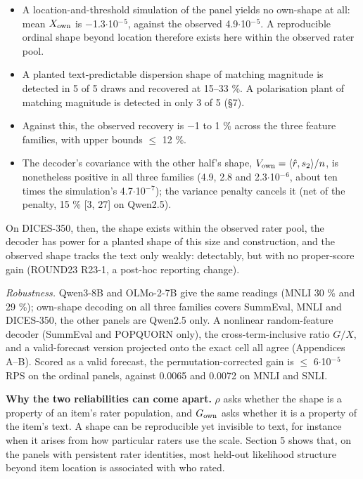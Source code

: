 \documentclass{article}
\providecommand{\tightlist}{\setlength{\itemsep}{0pt}\setlength{\parskip}{0pt}}
\begin{document}
\begin{itemize}
\tightlist
\item
  A location-and-threshold simulation of the panel yields no own-shape at all: mean \(X_{\rm own}\) is $-$1.3$\cdot$10$^{-}$$^{5}$, against the observed 4.9$\cdot$10$^{-}$$^{5}$. A reproducible ordinal shape beyond location therefore exists here within the observed rater pool.
\item
  A planted text-predictable dispersion shape of matching magnitude is detected in 5 of 5 draws and recovered at 15--33 \%. A polarisation plant of matching magnitude is detected in only 3 of 5 (\S{}7).
\item
  Against this, the observed recovery is $-$1 to 1 \% across the three feature families, with upper bounds $\leq$ 12 \%.
\item
  The decoder's covariance with the other half's shape, \(V_{\rm own}=\langle\hat r,s_2\rangle/n\), is nonetheless positive in all three families (4.9, 2.8 and 2.3$\cdot$10$^{-}$$^{6}$, about ten times the simulation's 4.7$\cdot$10$^{-}$$^{7}$); the variance penalty cancels it (net of the penalty, 15 \% {[}3, 27{]} on Qwen2.5).
\end{itemize}

On DICES-350, then, the shape exists within the observed rater pool, the decoder has power for a planted shape of this size and construction, and the observed shape tracks the text only weakly: detectably, but with no proper-score gain (ROUND23 R23-1, a post-hoc reporting change).

\emph{Robustness.} Qwen3-8B and OLMo-2-7B give the same readings (MNLI 30 \% and 29 \%); own-shape decoding on all three families covers SummEval, MNLI and DICES-350, the other panels are Qwen2.5 only. A nonlinear random-feature decoder (SummEval and POPQUORN only), the cross-term-inclusive ratio \(G/X\), and a valid-forecast version projected onto the exact cell all agree (Appendices A--B). Scored as a valid forecast, the permutation-corrected gain is $\leq$ 6$\cdot$10$^{-}$$^{5}$ RPS on the ordinal panels, against 0.0065 and 0.0072 on MNLI and SNLI.

\textbf{Why the two reliabilities can come apart.} \(\rho\) asks whether the shape is a property of an item's rater population, and \(G_{\rm own}\) asks whether it is a property of the item's text. A shape can be reproducible yet invisible to text, for instance when it arises from how particular raters use the scale. Section 5 shows that, on the panels with persistent rater identities, most held-out likelihood structure beyond item location is associated with who rated.
\end{document}
